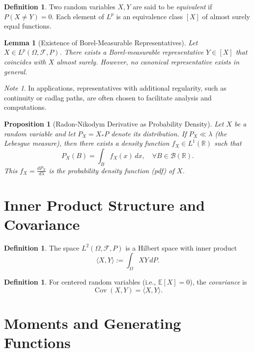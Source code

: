 \documentclass[11pt]{amsart}
\newtheorem{lemma}[theorem]{Lemma}
\newtheorem{proposition}[theorem]{Proposition}
\theoremstyle{definition}
\newtheorem{definition}[theorem]{Definition}
\theoremstyle{remark}
\newtheorem*{note}{Note}
\begin{document}
\begin{definition}
Two random variables $X, Y$ are said to be \emph{equivalent} if $P(X \neq Y)=0$. Each element of $L^p$ is an equivalence class $[X]$ of almost surely equal functions.
\end{definition}

\begin{lemma}[Existence of Borel-Measurable Representatives]
Let $X \in L^p(\Omega, \mathcal{F}, P)$. There exists a Borel-measurable representative $Y \in [X]$ that coincides with $X$ almost surely. However, no canonical representative exists in general.
\end{lemma}

\begin{note}
In applications, representatives with additional regularity, such as continuity or cadlag paths, are often chosen to facilitate analysis and computations.
\end{note}

\begin{proposition}[Radon-Nikodym Derivative as Probability Density]
Let $X$ be a random variable and let $P_X = X_*P$ denote its distribution. If $P_X \ll \lambda$ (the Lebesgue measure), then there exists a density function $f_X \in L^1(\mathbb{R})$ such that
\[
P_X(B) = \int_B f_X(x) \, dx, \quad \forall B \in \mathcal{B}(\mathbb{R}).
\]
This $f_X = \frac{dP_X}{d\lambda}$ is the \emph{probability density function} (pdf) of $X$.
\end{proposition}

\section{Inner Product Structure and Covariance}

\begin{definition}
The space $L^2(\Omega, \mathcal{F}, P)$ is a Hilbert space with inner product
\[
\langle X, Y \rangle := \int_\Omega X Y \, dP.
\]
\end{definition}

\begin{definition}
For centered random variables (i.e., $\mathbb{E}[X]=0$), the \emph{covariance} is
\[
\operatorname{Cov}(X, Y) = \langle X, Y \rangle.
\]
\end{definition}

\section{Moments and Generating Functions}
\end{document}
